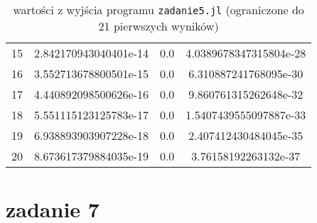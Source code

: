 \documentclass[11pt, a4paper]{article}
\begin{document}
\begin{table}[ht]
\begin{tabular}{|c|c|c|c|}
      15 & 2.842170943040401e-14 & 0.0 & 4.0389678347315804e-28 \\
      16 & 3.552713678800501e-15 & 0.0 & 6.310887241768095e-30 \\
      17 & 4.440892098500626e-16 & 0.0 & 9.860761315262648e-32 \\
      18 & 5.551115123125783e-17 & 0.0 & 1.5407439555097887e-33 \\
      19 & 6.938893903907228e-18 & 0.0 & 2.407412430484045e-35 \\
      20 & 8.673617379884035e-19 & 0.0 & 3.76158192263132e-37 \\
      \hline
    \end{tabular}
    \caption{wartości z wyjścia programu \texttt{zadanie5.jl} (ograniczone do 21 pierwszych wyników)}
  \end{table}
  \section*{zadanie 7}
\end{document}
